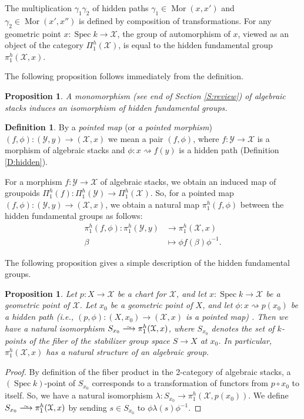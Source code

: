 \documentclass{amsart}
\newtheorem{prop}[thm]{Proposition}
\theoremstyle{definition}
\newtheorem{defn}[thm]{Definition}
\theoremstyle{remark}
\theoremstyle{remark}
\newcommand{\X}{\mathcal{X}}
\newcommand{\Y}{\mathcal{Y}}
\newcommand{\rsa}{\rightsquigarrow}
\newcommand{\PhX}{\Pi_1^{h}(\X)}
\newcommand{\phX}{\pi_1^{h}(\X,x)}
\newcommand{\PhY}{\Pi_1^{h}(\Y)}
\def\smashedlongrightarrow{\setbox0=\hbox{$\longrightarrow$}\ht0=1pt\box0}
\def\risom{\buildrel\sim\over{\smashedlongrightarrow}}
\let\:=\colon
\newcommand{\Spec}{\operatorname{Spec}}
\newcommand{\Mor}{\operatorname{Mor}}
\begin{document}
The multiplication $\gamma_1 \gamma_2$ of hidden paths $\gamma_1
\in \Mor(x,x')$ and $\gamma_2 \in \Mor(x',x'')$ is defined by
composition of transformations. For any geometric point $x \:
\Spec k \to \X$, the group of automorphism of $x$, viewed as an
object of the category $\PhX$, is equal to the hidden fundamental
group $\phX$.

The following proposition follows immediately from the definition.

\begin{prop}{\label{P:mono}}
A monomorphism (see end of Section \ref{S:review}) of algebraic
stacks induces an isomorphism of hidden fundamental groups.
\end{prop}

\begin{defn}{\label{D:pointed}}
By a {\sl pointed map} (or {\em a pointed morphism}) $(f, \phi) \:
(\Y,y) \to (\X,x)$ we mean a pair $(f, \phi)$, where $f \: \Y \to
\X$ is a morphism of algebraic stacks and $\phi \: x \rsa f(y)$ is
a hidden path (Definition \ref{D:hidden}).
\end{defn}

For a morphism $f \: \Y \to \X$ of algebraic stacks, we obtain an
induced  map of groupoids $\Pi_1^h(f) \: \PhY \to \PhX$. So, for a
pointed map $(f, \phi) \: (\Y,y) \to (\X,x)$, we obtain a natural
map $\pi_1^{h}(f, \phi)$ between the hidden fundamental groups as
follows:
\begin{align*}
\pi_1^{h}(f, \phi) \: \pi_1^{h}(\Y, y) & \to \pi_1^{h}(\X, x) \\
   \beta \ \ \  & \mapsto  \phi f(\beta) \phi^{-1}.
\end{align*}

The following proposition gives a simple description of the hidden
fundamental groups.

\begin{prop}{\label{P4}}
Let $p \: X \to \X$ be a chart for $\X$, and let $x \: \Spec k \to
\X$ be a geometric point  of $\X$. Let $x_0$ be a geometric point
of $X$, and let $\phi \: x \rsa p(x_0)$ be a hidden path (i.e.,
$(p,\phi) \: (X,x_0) \to (\X,x)$ is a pointed map) . Then we have
a natural isomorphism $S_{x_0} \risom \phX$, where $S_{x_0}$
denotes the set of $k$-points of the fiber of the stabilizer group
space $S \to X$ at $x_0$. In particular, $\phX$ has a natural
structure of an algebraic group.
\end{prop}

\begin{proof}
By definition of the fiber product in the 2-category of algebraic
stacks, a $(\Spec k)$-point of $S_{x_0}$ corresponds to a
transformation of functors from $p \circ x_0$ to itself. So, we
have a natural isomorphism $\lambda \: S_{x_0} \to \pi_1^{h}(\X,
p(x_0))$. We define $S_{x_0} \risom \phX$ by sending $s \in
S_{x_0}$ to $\phi \lambda(s) \phi^{-1}$.
\end{proof}
\end{document}
